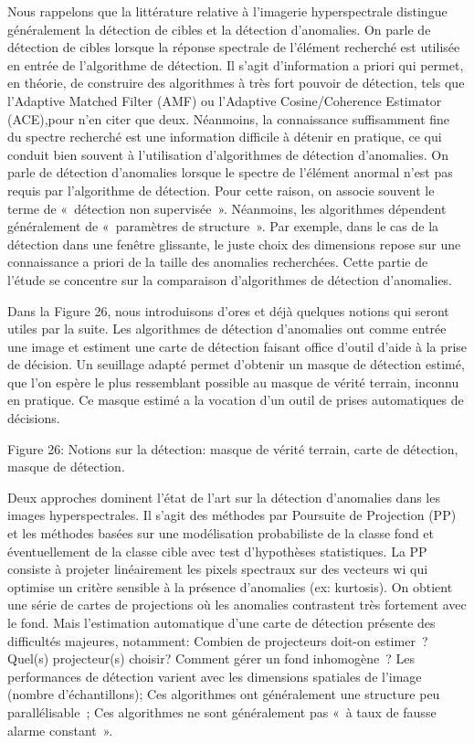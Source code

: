 Nous rappelons que la littérature relative à l’imagerie hyperspectrale distingue généralement la détection de cibles et la détection d’anomalies.
On parle de détection de cibles lorsque la réponse spectrale de l’élément recherché est utilisée en entrée de l’algorithme de détection. Il s’agit d’information a priori qui permet, en théorie, de construire des algorithmes à très fort pouvoir de détection, tels que l’Adaptive Matched Filter (AMF) ou l’Adaptive Cosine/Coherence Estimator (ACE),pour n’en citer que deux. Néanmoins, la connaissance suffisamment fine du spectre recherché est une information difficile à détenir en pratique, ce qui conduit bien souvent à l’utilisation d’algorithmes de détection d’anomalies.
On parle de détection d’anomalies lorsque le spectre de l’élément anormal n’est pas requis par l’algorithme de détection. Pour cette raison, on associe souvent le terme de « détection non supervisée ». Néanmoins, les algorithmes dépendent généralement de « paramètres de structure ». Par exemple, dans le cas de la détection dans une fenêtre glissante, le juste choix des dimensions repose sur une connaissance a priori de la taille des anomalies recherchées. Cette partie de l’étude se concentre sur la comparaison d’algorithmes de détection d’anomalies.

Dans la Figure 26, nous introduisons d’ores et déjà quelques notions qui seront utiles par la suite. Les algorithmes de détection d’anomalies ont comme entrée une image et estiment une carte de détection faisant office d’outil d’aide à la prise de décision. Un seuillage adapté permet d’obtenir un masque de détection estimé, que l’on espère le plus ressemblant possible au masque de vérité terrain, inconnu en pratique. Ce masque estimé a la vocation d’un outil de prises automatiques de décisions.

Figure 26: Notions sur la détection: masque de vérité terrain, carte de détection, masque de détection.

Deux approches dominent l’état de l’art sur la détection d’anomalies dans les images hyperspectrales. Il s’agit des méthodes par Poursuite de Projection (PP) et les méthodes basées sur une modélisation probabiliste de la classe fond et éventuellement de la classe cible avec test d’hypothèses statistiques.
La PP consiste à projeter linéairement les pixels spectraux sur des vecteurs wi qui optimise un critère sensible à la présence d’anomalies (ex: kurtosis). On obtient une série de cartes de projections où les anomalies contrastent très fortement avec le fond. Mais l’estimation automatique d’une carte de détection présente des difficultés majeures, notamment:
Combien de projecteurs doit-on estimer ?
Quel(s) projecteur(s) choisir?
Comment gérer un fond inhomogène ?
Les performances de détection varient avec les dimensions spatiales de l’image (nombre d’échantillons);
Ces algorithmes ont généralement une structure peu parallélisable ;
Ces algorithmes ne sont généralement pas « à taux de fausse alarme constant ».

